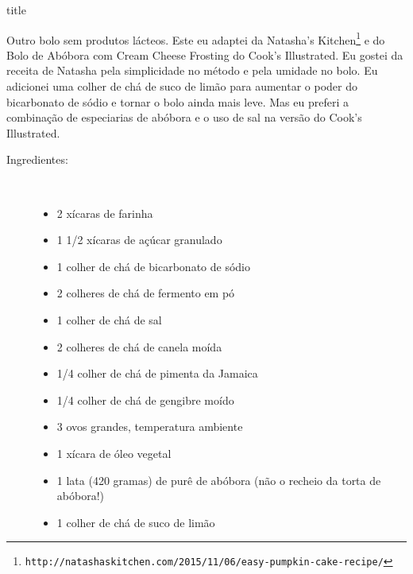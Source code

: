 \documentclass [11pt, letterpaper] {article}
\begin{document}
 {title}

Outro bolo sem produtos lácteos. Este eu adaptei da Natasha's Kitchen\footnote{{\tt http://natashaskitchen.com/2015/11/06/easy-pumpkin-cake-recipe/}} e do Bolo de Ab\'obora com Cream Cheese Frosting do Cook's Illustrated. Eu gostei da receita de Natasha pela simplicidade no método e pela umidade no bolo. Eu adicionei uma colher de chá de suco de limão para aumentar o poder do bicarbonato de sódio e tornar o bolo ainda mais leve. Mas eu preferi a combinação de especiarias de abóbora e o uso de sal na versão do Cook's Illustrated.

 
\begin {description}

\item [Ingredientes:] \ \\
\begin {itemize}
\item 2 xícaras de farinha
\item 1 1/2 xícaras de açúcar granulado
\item 1 colher de chá de bicarbonato de sódio
\item 2 colheres de chá de fermento em pó
\item 1 colher de chá de sal
\item 2 colheres de chá de canela mo\'ida
\item 1/4 colher de chá de pimenta da Jamaica
\item 1/4 colher de chá de gengibre moído
\item 3 ovos grandes, temperatura ambiente
\item 1 xícara de óleo vegetal
\item 1 lata (420 gramas) de purê de abóbora (não o recheio da torta de abóbora!)
\item 1 colher de chá de suco de limão
\end {itemize}


\end{description}
\end{document}
